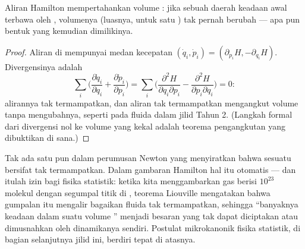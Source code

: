 \begin{theorem}\label{thm:b3:hamiltonian-mechanics:liouville}
Aliran Hamilton mempertahankan volume : jika sebuah daerah
keadaan awal terbawa oleh , volumenya (luasnya,
untuk satu ) tak pernah berubah --- apa pun bentuk yang
kemudian dimilikinya.
\end{theorem}

\begin{proof}
Aliran di  mempunyai medan kecepatan $(\dot q_i, \dot p_i) =
(\partial_{p_i}H, -\partial_{q_i}H)$. Divergensinya adalah
\[
\sum_i\Big(\frac{\partial\dot q_i}{\partial q_i}
 + \frac{\partial\dot p_i}{\partial p_i}\Big)
 = \sum_i\Big(\frac{\partial^2H}{\partial q_i\partial p_i}
 - \frac{\partial^2H}{\partial p_i\partial q_i}\Big) = 0 :
\]
alirannya tak termampatkan, dan aliran tak termampatkan mengangkut
volume tanpa mengubahnya, seperti pada fluida dalam jilid Tahun 2.
(Langkah formal dari divergensi nol ke volume yang kekal adalah teorema
pengangkutan yang dibuktikan di sana.)
\end{proof}

\begin{remark}\label{rem:b3:hamiltonian-mechanics:liouville-matters}
Tak ada satu pun dalam perumusan Newton yang menyiratkan bahwa sesuatu
bersifat tak termampatkan. Dalam gambaran Hamilton hal itu otomatis ---
dan itulah izin bagi fisika statistik: ketika kita menggambarkan gas
berisi $10^{23}$ molekul dengan segumpal titik di , teorema
Liouville mengatakan bahwa gumpalan itu mengalir bagaikan fluida tak
termampatkan, sehingga ``banyaknya keadaan dalam suatu volume '' menjadi besaran yang tak dapat diciptakan atau dimusnahkan oleh
dinamikanya sendiri. Postulat mikrokanonik fisika statistik, di bagian
selanjutnya jilid ini, berdiri tepat di atasnya.
\end{remark}

